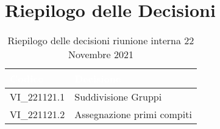 \section{Riepilogo delle Decisioni}


\begin{table}[!htbp]
\renewcommand{\arraystretch}{1.5}
\begin{tabular}{m{}<{\centering}  m{}<{\centering}}
\rowcolor{darkblue} \textcolor{white}{\textbf{Codice}} & \textcolor{white}{\textbf{Decisione}} \\
\hline
VI\_221121.1 & Suddivisione Gruppi\\
\rowcolor{gray!10} VI\_221121.2 & Assegnazione primi compiti \\
\end{tabular}
\caption{Riepilogo delle decisioni riunione interna 22 Novembre 2021}
\end{table}